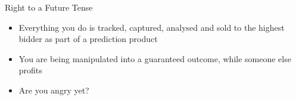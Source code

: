 \documentclass[aspectratio=169]{beamer}
\begin{document}
    {%
    \begin{frame}{Right to a Future Tense}
        \begin{itemize}
            \item Everything you do is tracked, captured, analysed and sold to
                the highest bidder as part of a \alert{prediction product}
            \item You are being manipulated into a \alert{guaranteed outcome},
                while someone else profits
            \pause{}
            \item Are you angry yet?
        \end{itemize}
    \end{frame}
    }
\end{document}

